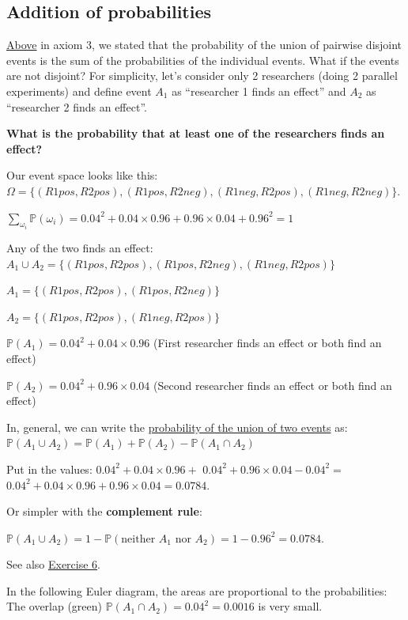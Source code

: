 \documentclass[
]{book}
\begin{document}
\subsection{Addition of probabilities}\label{addition_of_probabilities}

\hyperref[axioms_of_probability_theory]{Above} in axiom 3, we stated that the probability of the union of pairwise disjoint events is the sum of the
probabilities of the individual events.
What if the events are not disjoint? For simplicity, let's consider only 2 researchers (doing 2 parallel experiments) and define event \(A_1\) as ``researcher 1 finds an effect'' and
\(A_2\) as ``researcher 2 finds an effect''.

\textbf{What is the probability that at least one of the researchers finds an effect?}

Our event space looks like this:
\(\Omega = \{ (R1pos, R2pos), (R1pos, R2neg), (R1neg, R2pos), (R1neg, R2neg) \}.\)

\(\sum_{\omega_i} \mathbb{P}(\omega_i) = 0.04^2 + 0.04 \times 0.96 + 0.96 \times 0.04 + 0.96^2 = 1\)

Any of the two finds an effect:
\(A_1 \cup A_2 = \{ (R1pos, R2pos), (R1pos, R2neg), (R1neg, R2pos)\}\)

\(A_1 = \{ (R1pos, R2pos), (R1pos, R2neg)\}\)

\(A_2 = \{ (R1pos, R2pos), (R1neg, R2pos)\}\)

\(\mathbb{P}(A_1) = 0.04^2 + 0.04 \times 0.96\) (First researcher finds an effect or both find an effect)

\(\mathbb{P}(A_2) = 0.04^2 + 0.96 \times 0.04\) (Second researcher finds an effect or both find an effect)

In, general, we can write the \href{https://en.wikipedia.org/wiki/Probability\#Not_(necessarily)_mutually_exclusive_events}{probability of the union of two events} as:
\(\mathbb{P}(A_1 \cup A_2) = \mathbb{P}(A_1) + \mathbb{P}(A_2) - \mathbb{P}(A_1 \cap A_2)\)

Put in the values:
\(0.04^2 + 0.04 \times 0.96 +\)
\(0.04^2 + 0.96 \times 0.04 - 0.04^2=\)
\(0.04^2 + 0.04 \times 0.96 + 0.96 \times 0.04 = 0.0784\).

Or simpler with the \textbf{complement rule}:

\(\mathbb{P}(A_1 \cup A_2) = 1 - \mathbb{P}(\text{neither }A_1 \text{ nor }A_2) = 1-0.96^2 = 0.0784\).

See also \hyperref[exercise6]{Exercise 6}.

In the following Euler diagram, the areas are proportional to the probabilities: The overlap (green) \(\mathbb{P}(A_1 \cap A_2) = 0.04^2 = 0.0016\) is very small.
\end{document}

